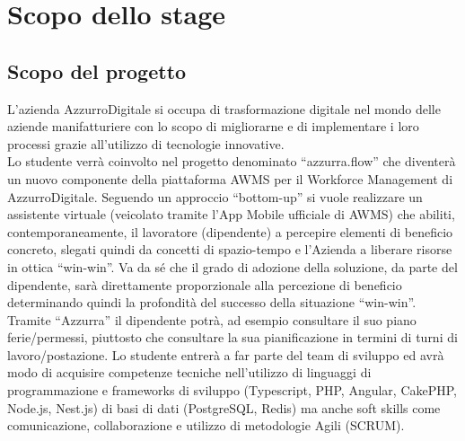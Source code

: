 \section{Scopo dello stage}
\subsection{Scopo del progetto}
L'azienda AzzurroDigitale si occupa di trasformazione digitale nel mondo delle aziende manifatturiere con lo scopo di migliorarne e di implementare i loro processi grazie all'utilizzo di tecnologie innovative.\\

Lo studente verrà coinvolto nel progetto denominato “azzurra.flow” che diventerà un nuovo componente della piattaforma AWMS per il Workforce Management di AzzurroDigitale.
Seguendo un approccio “bottom-up” si vuole realizzare un assistente virtuale (veicolato tramite l’App Mobile ufficiale di AWMS) che abiliti, contemporaneamente, il lavoratore (dipendente) a percepire elementi di beneficio concreto, slegati quindi da concetti di spazio-tempo e l’Azienda a liberare risorse in ottica “win-win”.
Va da sé che il grado di adozione della soluzione, da parte del dipendente, sarà direttamente proporzionale alla percezione di beneficio determinando quindi la profondità del successo della situazione “win-win”.
Tramite “Azzurra” il dipendente potrà, ad esempio consultare il suo piano ferie/permessi, piuttosto che consultare la sua pianificazione in termini di turni di lavoro/postazione.
Lo studente entrerà a far parte del team di sviluppo ed avrà modo di acquisire competenze tecniche nell’utilizzo di linguaggi di programmazione e frameworks di sviluppo (Typescript, PHP, Angular, CakePHP, Node.js, Nest.js) di basi di dati (PostgreSQL, Redis) ma anche soft skills come comunicazione, collaborazione e utilizzo di metodologie Agili (SCRUM).

